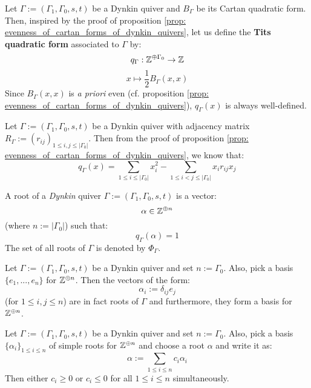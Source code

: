             \begin{definition} \label{def: tits_quadratic_forms}
                Let $\Gamma := (\Gamma_1, \Gamma_0, s, t)$ be a Dynkin quiver and $B_{\Gamma}$ be its Cartan quadratic form. Then, inspired by the proof of proposition \ref{prop: evenness_of_cartan_forms_of_dynkin_quivers}, let us define the \textbf{Tits quadratic form} associated to $\Gamma$ by:
                    $$q_{\Gamma}: \mathbb{Z}^{\oplus \Gamma_0} \to \mathbb{Z}$$
                    $$x \mapsto \frac12 B_{\Gamma}(x, x)$$
                Since $B_{\Gamma}(x, x)$ is \textit{a priori} even (cf. proposition \ref{prop: evenness_of_cartan_forms_of_dynkin_quivers}), $q_{\Gamma}(x)$ is always well-defined. 
            \end{definition}
            \begin{remark}
                Let $\Gamma := (\Gamma_1, \Gamma_0, s, t)$ be a Dynkin quiver with adjacency matrix $R_{\Gamma} := (r_{ij})_{1 \leq i, j \leq |\Gamma_0|}$. Then from the proof of proposition \ref{prop: evenness_of_cartan_forms_of_dynkin_quivers}, we know that:
                    $$q_{\Gamma}(x) = \sum_{1 \leq i \leq |\Gamma_0|} x_i^2 - \sum_{1 \leq i < j \leq |\Gamma_0|} x_i r_{ij} x_j$$
            \end{remark}
            \begin{definition}[Roots] \label{def: roots_of_dynkin_quivers}
                A root of a \textit{Dynkin} quiver $\Gamma := (\Gamma_1, \Gamma_0, s, t)$ is a vector:
                    $$\alpha \in \mathbb{Z}^{\oplus n}$$
                (where $n := |\Gamma_0|$) such that:
                    $$q_{\Gamma}(\alpha) = 1$$
                The set of all roots of $\Gamma$ is denoted by $\Phi_{\Gamma}$.
            \end{definition}
            \begin{example} \label{example: simple_roots}
                Let $\Gamma := (\Gamma_1, \Gamma_0, s, t)$ be a Dynkin quiver and set $n := \Gamma_0$. Also, pick a basis $\{e_1, ..., e_n\}$ for $\mathbb{Z}^{\oplus n}$. Then the vectors of the form:
                    $$\alpha_i := \delta_{ij} e_j$$
                (for $1 \leq i, j \leq n$) are in fact roots of $\Gamma$ and furthermore, they form a basis for $\mathbb{Z}^{\oplus n}$.
            \end{example}
            \begin{lemma} \label{lemma: roots_are_exclusively_either_negative_or_positive}
                Let $\Gamma := (\Gamma_1, \Gamma_0, s, t)$ be a Dynkin quiver and set $n := \Gamma_0$. Also, pick a basis $\{\alpha_i\}_{1 \leq i \leq n}$ of simple roots for $\mathbb{Z}^{\oplus n}$ and choose a root $\alpha$ and write it as:
                    $$\alpha := \sum_{1 \leq i \leq n} c_i \alpha_i$$
                Then either $c_i \geq 0$ or $c_i \leq 0$ for all $1 \leq i \leq n$ simultaneously.
            \end{lemma}
